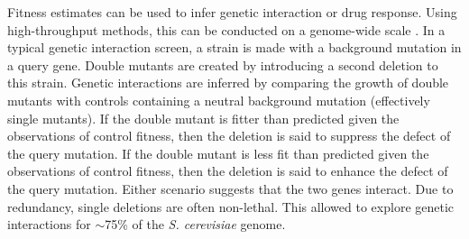 

Fitness estimates can be used to infer genetic interaction or drug
response. Using high-throughput methods, this can be conducted on a
genome-wide scale \citep{Costanzo2010,Andrew2013}. In a typical
genetic interaction screen, a strain is made with a background
mutation in a query gene. Double mutants are created by introducing a
second deletion to this strain. Genetic interactions are inferred by
comparing the growth of double mutants with controls containing a
neutral background mutation (effectively single mutants). If the
double mutant is fitter than predicted given the observations of
control fitness, then the deletion is said to suppress the defect of
the query mutation. If the double mutant is less fit than predicted
given the observations of control fitness, then the deletion is said
to enhance the defect of the query mutation. Either scenario suggests
that the two genes interact. Due to redundancy, single deletions are
often non-lethal. This allowed \citet{Costanzo2010} to explore genetic
interactions for \(\sim\)75\% of the \textit{S. cerevisiae} genome.



